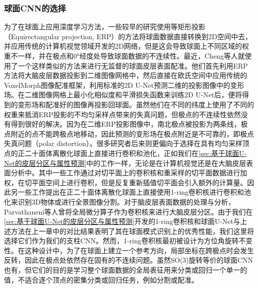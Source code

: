 \subsubsection{球面CNN的选择}
为了在球面上应用深度学习方法，一些较早的研究使用等矩形投影（Equirectangular projection, ERP）的方法将球面数据\cite{tateno2018distortion,hu2017deep,coors2018spherenet}直接转换到2D空间中去，并应用传统的计算机视觉领域开发的2D网络，但是这会导致球面上不同区域的权重不一样，并在极点和\ang{0}经度处导致球面数据的不连续性。最近，Cheng等人\cite{cheng2020cortical}就使用了一个这样类似的方法来进行无监督的球面皮层表面配准。他们首先利用ERP方法将大脑皮层数据投影到二维图像网格中，然后直接在欧氏空间中应用传统的VoxelMorph图像配准框架\cite{dalca2018unsupervised}，利用标准的2D U-Net\cite{ronneberger2015u}预测二维的投影图像中的变形场。在二维图像网格上最小化相似度和平滑损失函数来训练2D U-Net后，便将得到的变形场和配准好的图像再投影回球面。虽然他们在不同的纬度上使用了不同的权重来抵消ERP投影的不均匀采样点带来的失真问题，但极点的不连续性依然没有得到很好的解决。因为在二维ERP投影图像中，南北极点被投影为两条线，极点附近的点不能跨极点地移动，因此预测的变形场在极点附近是不可靠的，即极点失真问题（polar distortion）。很多研究者后来则更偏向于选择在具有均匀采样顶点的正二十面体离散化球面上直接进行卷积和池化，正如我们在\ref{sec:基于球面U-Net的皮层分区与属性预测}中的工作一样，无论是在计算机视觉\cite{zhao2018distortion,rao2019spherical,jiang2019spherical}还是在大脑皮层表面分析\cite{zhao2019spherical_ipmi,wu2018registration,seong2018geometric}中。其中一些工作通过对切平面上的卷积核和重采样的切平面数据进行加权，在切平面空间上进行卷积\cite{zhao2018distortion,wu2018registration,seong2018geometric}，但是反复重新插值切平面会引入额外的计算量。因此另一些工作提出在正二十面体离散化球面上直接使用1-ring卷积核进行卷积和池化来识别3D物体\cite{rao2019spherical}或进行全景图像分割\cite{jiang2019spherical}。对于脑皮层表面数据的处理与分析，Parvathaneni等人\cite{parvathaneni2019cortical}曾将全局微分算子\cite{jiang2019spherical}作为卷积核来进行大脑皮层分区。由于我们在\ref{sec:基于球面U-Net的皮层分区与属性预测}开发的1-ring卷积核和球面U-Net与上述方法在上一章中的对比结果表明了其在球面模式识别上的优秀性能，我们这里将选择它们作为我们的支柱CNN。然而，1-ring卷积核最初被设计为方位角旋转不变性。在这种设计中，为了在球面上建立一个参考方向，局部坐标在跨极点时会发生反转，因此在极点处依然存在固有的不连续问题。虽然SO(3)旋转等价的球面CNN\cite{esteves2018learning,cohen2018spherical}也有，但它们的目的是学习整个球面数据的全局表征用来分类或回归一个单一的值，不适合逐个顶点的密集分类或回归任务，例如分割或配准。

